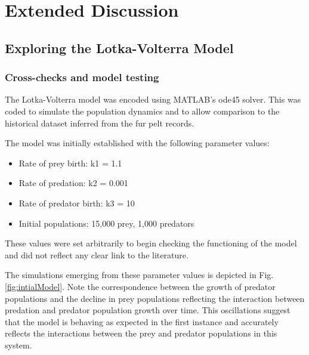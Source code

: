 \documentclass{article}
\begin{document}
\clearpage
\section{Extended Discussion}
\subsection{Exploring the Lotka-Volterra Model}
\subsubsection{Cross-checks and model testing}
The Lotka-Volterra model was encoded using MATLAB's ode45 solver. This was coded to simulate the population dynamics and to allow comparison to the historical dataset inferred from the fur pelt records. 

The model was initially established with the following parameter values:
\begin{itemize}
     \item Rate of prey birth: k1 = 1.1
     \item Rate of predation: k2 = 0.001
     \item Rate of predator birth: k3 = 10
     \item Initial populations: 15,000 prey, 1,000 predators
   \end{itemize}
   
These values were set arbitrarily to begin checking the functioning of the model and did not reflect any clear link to the literature. 

The simulations emerging from these parameter values is depicted in Fig. \ref{fig:intialModel}. Note the correspondence between the growth of predator populations and the decline in prey populations reflecting the interaction between predation and predator population growth over time. This oscillations suggest that the model is behaving as expected in the first instance and accurately reflects the interactions between the prey and predator populations in this system. 
\end{document}
